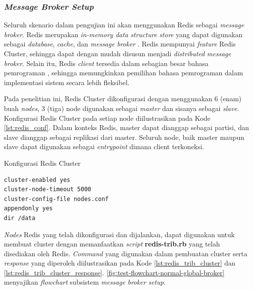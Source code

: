\subsubsection{\textit{Message Broker Setup}}
\label{ssec:broker-setup}
Seluruh skenario dalam pengujian ini akan menggunakan Redis sebagai \textit{message broker}. Redis merupakan \textit{in-memory data structure store} yang dapat digunakan sebagai \textit{database}, \textit{cache}, dan \textit{message broker} \citep{redis_introduction_2017}. Redis mempunyai \textit{feature} Redis Cluster, sehingga dapat dengan mudah disusun menjadi \textit{distributed message broker}. Selain itu, Redis \textit{client} tersedia dalam sebagian besar bahasa pemrograman \citep{redis_clients_2017}, sehingga memungkinkan pemilihan bahasa pemrograman dalam implementasi sistem secara lebih fleksibel.


Pada penelitian ini, Redis Cluster dikonfigurasi dengan menggunakan 6 (enam) buah \textit{nodes}, 3 (tiga) node digunakan sebagai \textit{master} dan sisanya sebagai \textit{slave}. Konfigurasi Redis Cluster pada setiap node diilustrasikan pada Kode \autoref{lst:redis_conf}. Dalam konteks Redis, master dapat dianggap sebagai partisi, dan slave dianggap sebagai replikasi dari master. Seluruh node, baik master maupun slave dapat digunakan sebagai \textit{entrypoint} dimana client terkoneksi.


\begin{listing}[!]
	\caption{Konfigurasi Redis Cluster}
	\label{lst:redis_conf}
	\begin{verbatim}
cluster-enabled yes
cluster-node-timeout 5000
cluster-config-file nodes.conf
appendonly yes
dir /data
	\end{verbatim}
\end{listing}


\textit{Nodes} Redis yang telah dikonfigurasi dan dijalankan, dapat digunakan untuk membuat cluster dengan memanfaatkan  \textit{script} \textbf{redis-trib.rb} yang telah disediakan oleh Redis. \textit{Command} yang digunakan dalam pembuatan cluster serta  \textit{response} yang diperoleh diilustrasikan pada Kode \autoref{lst:redis_trib_cluster} dan \autoref{lst:redis_trib_cluster_response}. \autoref{fig:test-flowchart-normal-global-broker} 
menyajikan \textit{flowchart} subsistem \textit{message broker setup}. 


